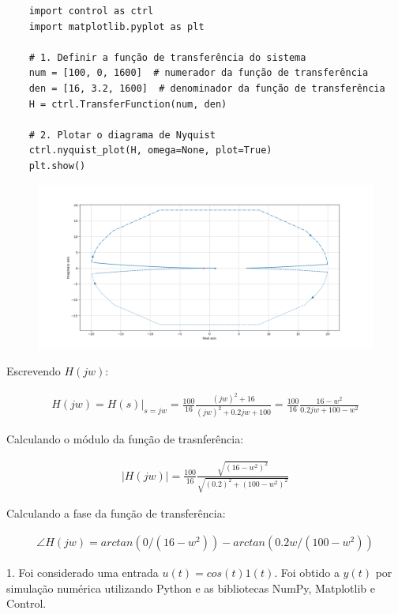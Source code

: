 \documentclass[10pt]{article}
\begin{document}
\begin{verbatim}
    import control as ctrl
    import matplotlib.pyplot as plt

    # 1. Definir a função de transferência do sistema
    num = [100, 0, 1600]  # numerador da função de transferência
    den = [16, 3.2, 1600]  # denominador da função de transferência
    H = ctrl.TransferFunction(num, den)

    # 2. Plotar o diagrama de Nyquist
    ctrl.nyquist_plot(H, omega=None, plot=True)
    plt.show()
\end{verbatim}

\begin{figure}[h]
    \includegraphics[scale=0.45]{nyquist.png}
    \centering
\end{figure}

Escrevendo $H(jw)$:

\begin{align*}
    H(jw) = H(s)|_{s=jw} = \frac{100}{16} \frac{(jw)^2 + 16}{(jw)^2 + 0.2jw + 100} = \frac{100}{16} \frac{16 - w^2}{0.2jw + 100 - w^2}
\end{align*}

Calculando o módulo da função de trasnferência:

\begin{align*}
    |H(jw)| = \frac{100}{16} \frac{\sqrt{(16 - w^2)^2}}{\sqrt{(0.2)^2 + (100 - w^2)^2}}
\end{align*}

Calculando a fase da função de transferência:

\begin{align*}
    \angle H(jw) = arctan(0/(16 - w^2)) - arctan(0.2w/(100 - w^2))
\end{align*}

1. Foi considerado uma entrada $u(t) = cos(t) 1(t)$. Foi obtido a $y(t)$ por simulação numérica utilizando Python
e as bibliotecas NumPy, Matplotlib e Control.
\end{document}
